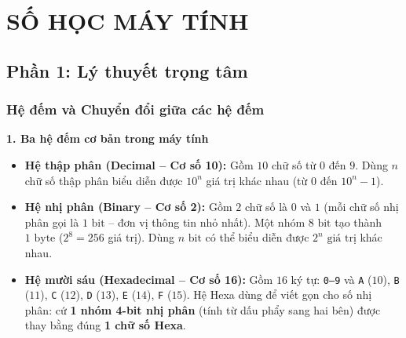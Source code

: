 \chapter{SỐ HỌC MÁY TÍNH}

\section{Phần 1: Lý thuyết trọng tâm}

\subsection{Hệ đếm và Chuyển đổi giữa các hệ đếm}

\textbf{1. Ba hệ đếm cơ bản trong máy tính}
\begin{itemize}
    \item \textbf{Hệ thập phân (Decimal -- Cơ số 10):} Gồm $10$ chữ số từ $0$ đến $9$. Dùng $n$ chữ số thập phân biểu diễn được $10^n$ giá trị khác nhau (từ $0$ đến $10^n - 1$).
    \item \textbf{Hệ nhị phân (Binary -- Cơ số 2):} Gồm $2$ chữ số là $0$ và $1$ (mỗi chữ số nhị phân gọi là $1\text{ bit}$ -- đơn vị thông tin nhỏ nhất). Một nhóm $8\text{ bit}$ tạo thành $1\text{ byte}$ ($2^8 = 256$ giá trị). Dùng $n\text{ bit}$ có thể biểu diễn được \textbf{$2^n\text{ giá trị}$} khác nhau.
    \item \textbf{Hệ mười sáu (Hexadecimal -- Cơ số 16):} Gồm $16$ ký tự: \texttt{0--9} và \texttt{A} ($10$), \texttt{B} ($11$), \texttt{C} ($12$), \texttt{D} ($13$), \texttt{E} ($14$), \texttt{F} ($15$). Hệ Hexa dùng để viết gọn cho số nhị phân: cứ \textbf{1 nhóm 4-bit nhị phân} (tính từ dấu phẩy sang hai bên) được thay bằng đúng \textbf{1 chữ số Hexa}.
\end{itemize}

